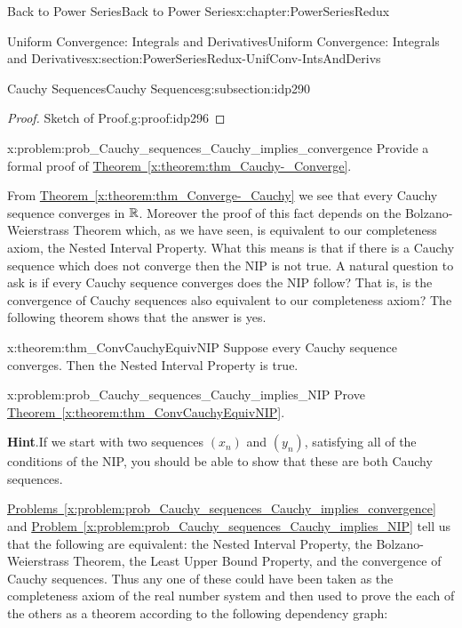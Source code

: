 \begin{chapterptx}{Back to Power Series}{}{Back to Power Series}{}{}{x:chapter:PowerSeriesRedux}
\begin{sectionptx}{Uniform Convergence: Integrals and Derivatives}{}{Uniform Convergence: Integrals and Derivatives}{}{}{x:section:PowerSeriesRedux-UnifConv-IntsAndDerivs}
\begin{subsectionptx}{Cauchy Sequences}{}{Cauchy Sequences}{}{}{g:subsection:idp290}
\begin{proof}{Sketch of Proof.}{g:proof:idp296}
			\end{proof}
			\begin{problem}{}{x:problem:prob_Cauchy_sequences_Cauchy_implies_convergence}%
				 Provide a formal proof of \hyperref[x:theorem:thm_Cauchy-_Converge]{Theorem~{\xreffont\ref{x:theorem:thm_Cauchy-_Converge}}}.%
			\end{problem}
			From \hyperref[x:theorem:thm_Converge-_Cauchy]{Theorem~{\xreffont\ref{x:theorem:thm_Converge-_Cauchy}}} we see that every Cauchy sequence converges in \(\mathbb {R}\). Moreover the proof of this fact depends on the Bolzano-Weierstrass Theorem which, as we have seen, is equivalent to our completeness axiom, the Nested Interval Property. What this means is that if there is a Cauchy sequence which does not converge then the NIP is not true. A natural question to ask is if every Cauchy sequence converges does the NIP follow? That is, is the convergence of Cauchy sequences also equivalent to our completeness axiom? The following theorem shows that the answer is yes.%
			\begin{theorem}{}{}{x:theorem:thm_ConvCauchyEquivNIP}%
				 Suppose every Cauchy sequence converges. Then the Nested Interval Property is true.%
			\end{theorem}
			\begin{problem}{}{x:problem:prob_Cauchy_sequences_Cauchy_implies_NIP}%
				Prove \hyperref[x:theorem:thm_ConvCauchyEquivNIP]{Theorem~{\xreffont\ref{x:theorem:thm_ConvCauchyEquivNIP}}}.%
				\par\smallskip%
				\noindent\textbf{\blocktitlefont Hint}.\hypertarget{g:hint:idp297}{}\quad{}If we start with two sequences \(\left(x_n\right)\) and \(\left(y_n\right)\), satisfying all of the conditions of the NIP, you should be able to show that these are both Cauchy sequences.%
			\end{problem}
			\hyperref[x:problem:prob_Cauchy_sequences_Cauchy_implies_convergence]{Problems~{\xreffont\ref{x:problem:prob_Cauchy_sequences_Cauchy_implies_convergence}}} and \hyperref[x:problem:prob_Cauchy_sequences_Cauchy_implies_NIP]{Problem~{\xreffont\ref{x:problem:prob_Cauchy_sequences_Cauchy_implies_NIP}}} tell us that the following are equivalent: the Nested Interval Property, the Bolzano-Weierstrass Theorem, the Least Upper Bound Property, and the convergence of Cauchy sequences. Thus any one of these could have been taken as the completeness axiom of the real number system and then used to prove the each of the others as a theorem according to the following dependency graph:%

\end{subsectionptx}
\end{sectionptx}
\end{chapterptx}
